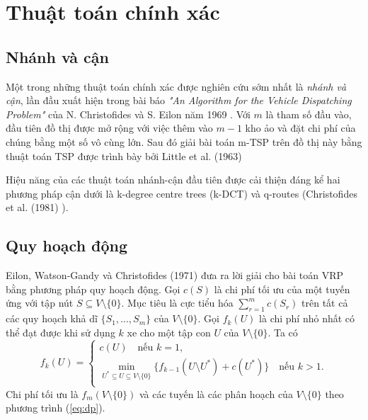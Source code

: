 \section{Thuật toán chính xác}

\subsection{Nhánh và cận}

Một trong những thuật toán chính xác được nghiên cứu sớm nhất là \textit{nhánh và cận}, lần đầu xuất hiện trong bài báo \textit{"An Algorithm for the Vehicle Dispatching Problem"} của N. Christofides và S. Eilon năm 1969 \cite{christofides1969algorithm}. Với $m$ là tham số đầu vào, đầu tiên đồ thị được mở rộng với việc thêm vào $m-1$ kho ảo và đặt chi phí của chúng bằng một số vô cùng lớn. Sau đó giải bài toán m-TSP trên đồ thị này bằng thuật toán TSP được trình bày bởi Little et al. (1963) \cite{little1963algorithm}

Hiệu năng của các thuật toán nhánh-cận đầu tiên được cải thiện đáng kể hai phương pháp cận dưới là k-degree centre trees (k-DCT) và q-routes (Christofides et al. (1981) \cite{christofides1981exact}).

\subsection{Quy hoạch động}

Eilon, Watson-Gandy và Christofides (1971) \cite{christofides1969algorithm} đưa ra lời giải cho bài toán VRP bằng phương pháp quy hoạch động. Gọi $c(S)$ là chi phí tối ưu của một tuyến ứng với tập nút $S \subseteq V \setminus \{0\}$. Mục tiêu là cực tiểu hóa $\sum_{r=1}^{m} c(S_r)$ trên tất cả các quy hoạch khả dĩ $\{S_1,...,S_m\}$ của $V \setminus \{0\}$. Gọi $f_k(U)$ là chi phí nhỏ nhất có thể đạt được khi sử dụng $k$ xe cho một tập con $U$ của $V \setminus \{0\}$. Ta có
\begin{equation}
	\label{eq:dp}
	f_k(U) =
	\begin{cases}
		c(U) \quad \text{nếu } k = 1,                                                                                      \\
		\min_{U^* \subseteq U \subseteq V \setminus \{0\}} \{f_{k-1} (U \setminus U^*) + c(U^*)\} \quad \text{nếu } k > 1. \\
	\end{cases}
\end{equation}
Chi phí tối ưu là $f_m(V \setminus \{0\})$ và các tuyến là các phân hoạch của $V \setminus \{0\}$ theo phương trình (\ref{eq:dp}).

